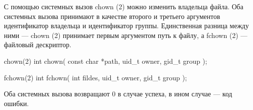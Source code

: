 С помощью системных вызов chown (2) можно изменить владельца файла. Оба системных вызова принимают в качестве второго и третьего аргументов идентификатор владельца и идентификатор группы. Единственная разница между ними --- chown (2) принимает первым аргументом путь к файлу, а fchown (2) --- файловый дескриптор.

\begin{CCode}{chown(2)}
	int chown(
		const char *path, 
		uid_t owner,
		gid_t group
	); \end{CCode}

\begin{CCode}{fchown(2)}
	int fchown(
		int fildes, 
		uid_t owner,
		gid_t group
); \end{CCode}

Оба системных вызова возвращают 0 в случае успеха, в ином случае --- код ошибки.
